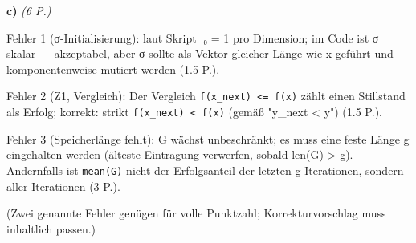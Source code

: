 \documentclass[11pt, a4paper]{article}
\begin{document}
\textbf{c)} \textit{(6 P.)}

Fehler 1 (σ-Initialisierung): laut Skript σ⃗₀ = 1⃗ pro Dimension; im Code ist σ skalar — akzeptabel, aber σ sollte als Vektor gleicher Länge wie x geführt und komponentenweise mutiert werden (1.5 P.).

Fehler 2 (Z1, Vergleich): Der Vergleich \texttt{f(x\_next) <= f(x)} zählt einen Stillstand als Erfolg; korrekt: strikt \texttt{f(x\_next) < f(x)} (gemäß "y\_next < y") (1.5 P.).

Fehler 3 (Speicherlänge fehlt): G wächst unbeschränkt; es muss eine feste Länge g eingehalten werden (älteste Eintragung verwerfen, sobald len(G) > g). Andernfalls ist \texttt{mean(G)} nicht der Erfolgsanteil der letzten g Iterationen, sondern aller Iterationen (3 P.).


(Zwei genannte Fehler genügen für volle Punktzahl; Korrekturvorschlag muss inhaltlich passen.)





\end{document}
